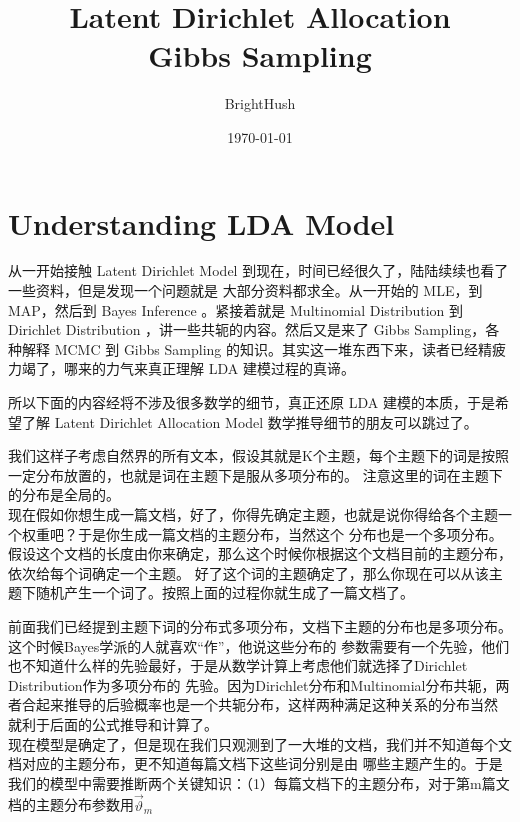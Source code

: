 \documentclass[UTF8]{ctexart}
\title{Latent Dirichlet Allocation \\ Gibbs Sampling}
\author{BrightHush}
\date{\today}
\begin{document}
\maketitle
\tableofcontents

\pagestyle{fancy}
\cfoot{\thepage}

\newcommand{\figref}[1]{\figurename~\ref{#1}}
\section{Understanding LDA Model}
从一开始接触 Latent Dirichlet Model 到现在，时间已经很久了，陆陆续续也看了一些资料，但是发现一个问题就是
大部分资料都求全。从一开始的 MLE，到 MAP，然后到 Bayes Inference 。紧接着就是 Multinomial Distribution 
到 Dirichlet Distribution ，讲一些共轭的内容。然后又是来了 Gibbs Sampling，各种解释 MCMC 到 Gibbs Sampling
的知识。其实这一堆东西下来，读者已经精疲力竭了，哪来的力气来真正理解 LDA 建模过程的真谛。
\par
所以下面的内容经将不涉及很多数学的细节，真正还原 LDA 建模的本质，于是希望了解 Latent Dirichlet Allocation Model
数学推导细节的朋友可以跳过了。
\par
我们这样子考虑自然界的所有文本，假设其就是K个主题，每个主题下的词是按照一定分布放置的，也就是词在主题下是服从多项分布的。
注意这里的词在主题下的分布是全局的。\\
现在假如你想生成一篇文档，好了，你得先确定主题，也就是说你得给各个主题一个权重吧？于是你生成一篇文档的主题分布，当然这个
分布也是一个多项分布。假设这个文档的长度由你来确定，那么这个时候你根据这个文档目前的主题分布，依次给每个词确定一个主题。
好了这个词的主题确定了，那么你现在可以从该主题下随机产生一个词了。按照上面的过程你就生成了一篇文档了。
\par
前面我们已经提到主题下词的分布式多项分布，文档下主题的分布也是多项分布。这个时候Bayes学派的人就喜欢“作”，他说这些分布的
参数需要有一个先验，他们也不知道什么样的先验最好，于是从数学计算上考虑他们就选择了Dirichlet Distribution作为多项分布的
先验。因为Dirichlet分布和Multinomial分布共轭，两者合起来推导的后验概率也是一个共轭分布，这样两种满足这种关系的分布当然
就利于后面的公式推导和计算了。
\\
现在模型是确定了，但是现在我们只观测到了一大堆的文档，我们并不知道每个文档对应的主题分布，更不知道每篇文档下这些词分别是由
哪些主题产生的。于是我们的模型中需要推断两个关键知识：（1）每篇文档下的主题分布，对于第m篇文档的主题分布参数用$\vec{\vartheta}_m$
\end{document}
